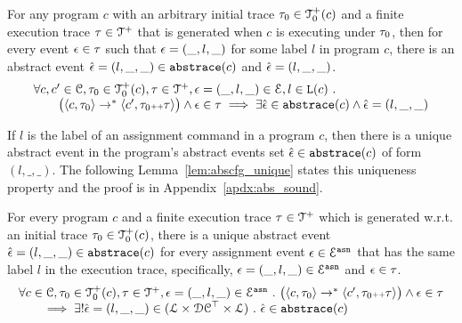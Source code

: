 \begin{lem}
\label{lem:abscfg_sound}
For any program $c$ with 
 an arbitrary initial trace $\mathtt{\tau}_0 \in \mathcal{T}^{+}_0(c)$ and
 a finite execution trace $\mathtt{\tau} \in \mathcal{T}^{+}$ that is generated 
 when $c$ is executing under $\mathtt{\tau}_0$,
 then for every event $\mathtt{\epsilon} \in \mathtt{\tau}$ such that $\mathtt{\epsilon} = (\_, l, \_)$ for some label $l$ in program $c$,
 there is an abstract event $\hat{\mathtt{\epsilon}{}} = (l, \_, \_) \in \mathtt{abs}{\mathtt{trace}}(c)$ and $\hat{\mathtt{\epsilon}{}} = (l, \_, \_)$.
%
\[
\begin{array}{l}
 \forall c, c' \in \mathcal{C}, \mathtt{\tau}_0 \in \mathcal{T}^{+}_0(c), \mathtt{\tau} \in \mathcal{T}^{+} , \mathtt{\epsilon} = (\_, l, \_) \in \mathcal{E}, l \in \mathtt{L}(c) ~.~
 \\ \qquad 
 \big(
 \langle {c}, \mathtt{\tau}_0 \rangle \to^{*} \langle c', \mathtt{\tau}_0 {\scriptscriptstyle ++} \mathtt{\tau} \rangle 
 \big)
 \land \mathtt{\epsilon} \in \mathtt{\tau} 
 \implies \exists 
 \hat{\mathtt{\epsilon}{}} \in \mathtt{abs}{\mathtt{trace}}(c) \land \hat{\mathtt{\epsilon}{}} = (l, \_, \_)
\end{array}
\]
\end{lem}
If $l$ is the label of an assignment command in a program $c$,
then there is a unique abstract event in the program's abstract events set
$\hat{\mathtt{\epsilon}{}} \in \mathtt{abs}{\mathtt{trace}}(c)$ of form $(l, \_, \_)$. 
The following Lemma~\ref{lem:abscfg_unique} states this uniqueness property and the proof is in Appendix~\ref{apdx:abs_sound}.
\begin{lem}
\label{lem:abscfg_unique}
For every program $c$ and
a finite execution trace $\mathtt{\tau} \in \mathcal{T}^{+}$ which is generated w.r.t.
an initial trace $\mathtt{\tau}_0 \in \mathcal{T}^{+}_0(c)$,
there is a unique abstract event $\hat{\mathtt{\epsilon}{}} = (l, \_, \_) \in \mathtt{abs}{\mathtt{trace}}(c)$ 
for every assignment event $\mathtt{\epsilon} \in \mathcal{E}^{\mathtt{{asn}}}$ that has the same label $l$ in the
execution trace, specifically, $\mathtt{\epsilon} = (\_, l, \_) \in \mathcal{E}^{\mathtt{{asn}}}$ and $\mathtt{\epsilon} \in \mathtt{\tau}$.
%
\[
 \begin{array}{l}
 \forall c \in \mathcal{C}, \mathtt{\tau}_0 \in \mathcal{T}^{+}_0(c), \mathtt{\tau} \in \mathcal{T}^{+} , \mathtt{\epsilon} = (\_, l, \_) \in \mathcal{E}^{\mathtt{{asn}}} ~.~
 \big(
 \langle {c}, \mathtt{\tau}_0 \rangle \to^{*} \langle c', \mathtt{\tau}_0 {\scriptscriptstyle ++} \mathtt{\tau} \rangle 
 \big)
 \land \mathtt{\epsilon} \in \mathtt{\tau} 
 \\
 \qquad \implies \exists ! \hat{\mathtt{\epsilon}{}} = (l, \_, \_) \in (\mathcal{L}\times \mathcal{DC}^{\top} \times \mathcal{L}) ~.~ 
 \hat{\mathtt{\epsilon}{}} \in \mathtt{abs}{\mathtt{trace}}(c)
 \end{array}
\]
\end{lem}
%
